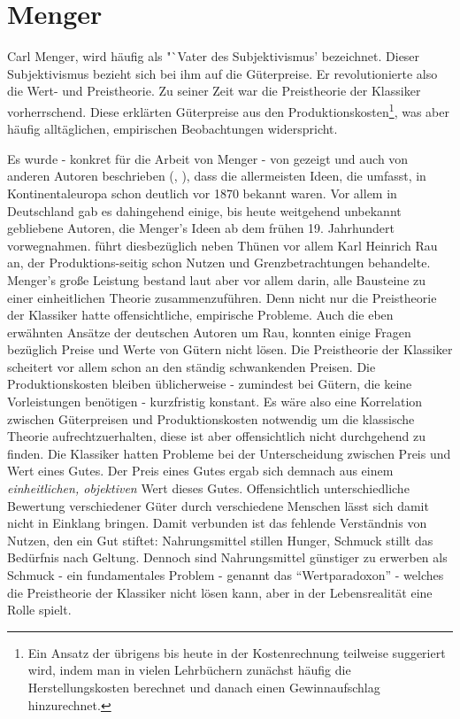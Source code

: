 \section{Menger}
\label{Wiener Schule}

Carl Menger, wird häufig als "`Vater des Subjektivismus' bezeichnet. Dieser Subjektivismus bezieht sich bei ihm auf die Güterpreise. Er revolutionierte also die Wert- und Preistheorie. Zu seiner Zeit war die Preistheorie der Klassiker vorherrschend. Diese erklärten Güterpreise aus den Produktionskosten\footnote{Ein Ansatz der übrigens bis heute in der Kostenrechnung teilweise suggeriert wird, indem man in vielen Lehrbüchern zunächst häufig die Herstellungskosten berechnet und danach einen Gewinnaufschlag hinzurechnet.}, was aber häufig alltäglichen, empirischen Beobachtungen widerspricht. 

Es wurde - konkret für die Arbeit von Menger - von \textcite{Streissler1990} gezeigt und auch von anderen Autoren beschrieben (\textcite{Blaug1973}, \textcite{Ekelund2002}), dass die allermeisten Ideen, die \textcite{Menger1871} umfasst, in Kontinentaleuropa schon deutlich vor 1870 bekannt waren. Vor allem in Deutschland gab es dahingehend einige, bis heute weitgehend unbekannt gebliebene Autoren, die Menger's Ideen ab dem frühen 19. Jahrhundert vorwegnahmen. \textcite[S. 159]{Blaug2001} führt diesbezüglich neben Thünen vor allem Karl Heinrich Rau an, der  Produktions-seitig schon Nutzen und Grenzbetrachtungen behandelte. Menger's große Leistung bestand laut \textcite[S. 295]{Rosner2012} aber vor allem darin, alle Bausteine zu einer einheitlichen Theorie zusammenzuführen. Denn nicht nur die Preistheorie der Klassiker hatte offensichtliche, empirische Probleme. Auch die eben erwähnten Ansätze der deutschen Autoren um Rau, konnten einige Fragen bezüglich Preise und Werte von Gütern nicht lösen. Die Preistheorie der Klassiker scheitert vor allem schon an den ständig schwankenden Preisen. Die Produktionskosten bleiben üblicherweise - zumindest bei Gütern, die keine Vorleistungen benötigen - kurzfristig konstant. Es wäre also eine Korrelation zwischen Güterpreisen und Produktionskosten notwendig um die klassische Theorie aufrechtzuerhalten, diese ist aber offensichtlich nicht durchgehend zu finden. Die Klassiker hatten Probleme bei der Unterscheidung zwischen Preis und Wert eines Gutes. Der Preis eines Gutes ergab sich demnach aus einem \textit{einheitlichen, objektiven} Wert dieses Gutes. Offensichtlich unterschiedliche Bewertung verschiedener Güter durch verschiedene Menschen lässt sich damit nicht in Einklang bringen. Damit verbunden ist das fehlende Verständnis von Nutzen, den ein Gut stiftet: Nahrungsmittel stillen Hunger, Schmuck stillt das Bedürfnis nach Geltung. Dennoch sind Nahrungsmittel günstiger zu erwerben als Schmuck - ein fundamentales Problem - genannt das "`Wertparadoxon"' - welches die Preistheorie der Klassiker nicht lösen kann, aber in der Lebensrealität eine Rolle spielt.

